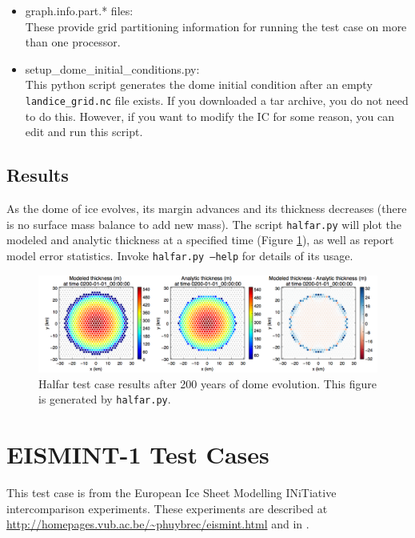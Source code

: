 \begin{itemize}
	\item graph.info.part.* files: \\ 
		These provide grid partitioning information for running the test case on more than one processor.  
		
	\item setup\_dome\_initial\_conditions.py: \\
		This python script generates the dome initial condition after an empty \texttt{landice\_grid.nc} file exists.  
		If you downloaded a tar archive, you do not need to do this.  However, if you want to modify the IC for 
		some reason, you can edit and run this script.

\end{itemize}

\subsection{Results}
\label{subsecc:halfar_results}
As the dome of ice evolves, its margin advances and its thickness decreases (there is no surface mass balance to add new mass).  The script \texttt{halfar.py} will plot the modeled and analytic thickness at a specified time (Figure \ref{fig:halfarresults}), as well as report model error statistics.  Invoke \texttt{halfar.py --help} for details of its usage.


\begin{figure}[H]
	\centering
	\includegraphics[width=16.4cm]{landice/figures/halfar.png}
	\caption{Halfar test case results after 200 years of dome evolution. This figure is generated by \texttt{halfar.py}.}
	\label{fig:halfarresults}
\end{figure}


\FloatBarrier


\section{EISMINT-1 Test Cases}
\label{sec:eismint_description}
This test case is from the European Ice Sheet Modelling INiTiative intercomparison experiments.  These experiments are described at \url{http://homepages.vub.ac.be/~phuybrec/eismint.html} and in \citet{huybrechts1996}.

